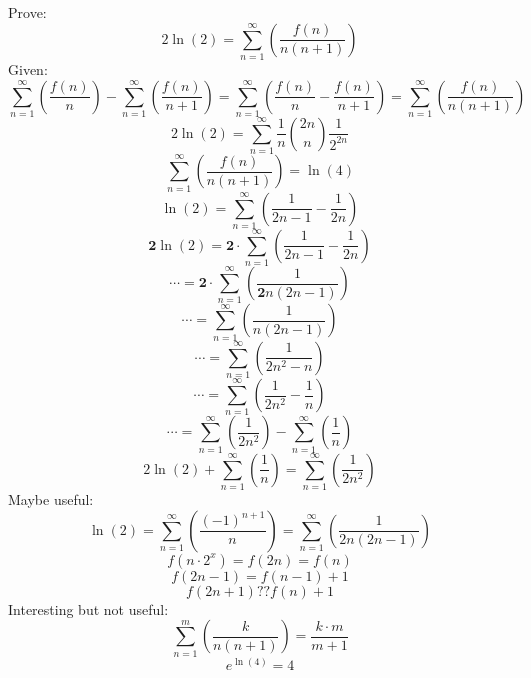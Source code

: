 \documentclass{article}
\begin{document}
Prove:
$$2\ln(2) = \sum_{n=1}^\infty \left( \frac{f(n)}{n(n+1)} \right)$$
Given:
$$\sum_{n=1}^\infty \left( \frac{f(n)}{n} \right) - \sum_{n=1}^\infty \left( \frac{f(n)}{n+1} \right) = \sum_{n=1}^\infty \left( \frac{f(n)}{n} - \frac{f(n)}{n+1} \right) = \sum_{n=1}^\infty \left( \frac{f(n)}{n(n+1)} \right) $$
$$2\ln(2) = \sum_{n=1}^\infty \frac{1}{n} {2n \choose n} \frac{1}{2^{2n}}$$
$$\sum_{n=1}^\infty \left( \frac{f(n)}{n(n+1)} \right) = \ln(4)$$
$$\ln(2) = \sum_{n=1}^\infty \left( \frac{1}{2n - 1} - \frac{1}{2n} \right)$$
$$\mathbf{2}\ln(2) = \mathbf{2} \cdot \sum_{n=1}^\infty \left( \frac{1}{2n - 1} - \frac{1}{2n} \right)$$
$$\cdots = \mathbf{2} \cdot \sum_{n=1}^\infty \left( \frac{1}{\mathbf{2}n(2n-1)} \right)$$
$$\cdots = \sum_{n=1}^\infty \left( \frac{1}{n(2n-1)} \right)$$
$$\cdots = \sum_{n=1}^\infty \left( \frac{1}{2n^2 - n} \right)$$
$$\cdots = \sum_{n=1}^\infty \left( \frac{1}{2n^2} - \frac{1}{n} \right)$$
$$\cdots = \sum_{n=1}^\infty \left( \frac{1}{2n^2} \right) - \sum_{n=1}^\infty \left( \frac{1}{n} \right)$$
$$2\ln(2) + \sum_{n=1}^\infty \left( \frac{1}{n} \right) = \sum_{n=1}^\infty \left( \frac{1}{2n^2} \right)$$
Maybe useful:
$$\ln(2) = \sum_{n=1}^\infty \left( \frac{(-1)^{n+1}}{n} \right) = \sum_{n=1}^\infty \left( \frac{1}{2n(2n-1)} \right)$$
$$f(n \cdot 2^x) = f(2n) = f(n)$$
$$f(2n-1) = f(n-1) +1$$
$$f(2n+1) ?? f(n) +1$$
Interesting but not useful:
$$\sum_{n=1}^m \left( \frac{k}{n(n+1)} \right) = \frac{k \cdot m}{m+1}$$
$$e^{\ln(4)} = 4$$
\end{document}
